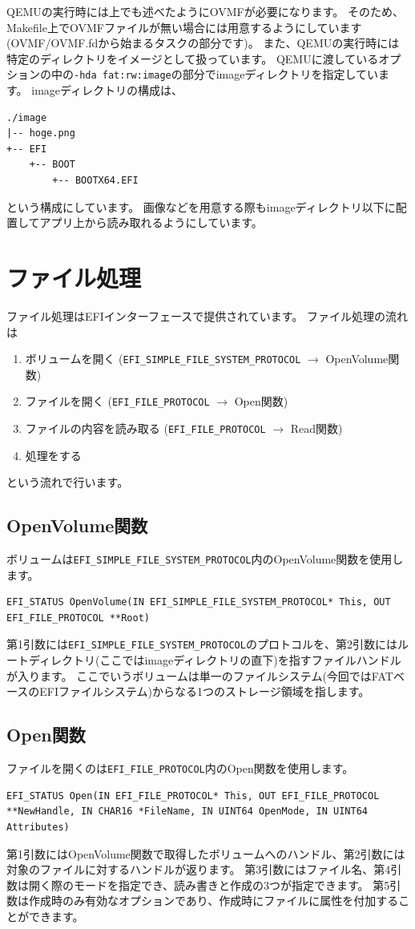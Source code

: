 \documentclass[10pt,b5paper,twoside,openany]{ltjsbook}
\begin{document}
QEMUの実行時には上でも述べたようにOVMFが必要になります。
そのため、Makefile上でOVMFファイルが無い場合には用意するようにしています(OVMF/OVMF.fdから始まるタスクの部分です)。
また、QEMUの実行時には特定のディレクトリをイメージとして扱っています。
QEMUに渡しているオプションの中の\verb+-hda fat:rw:image+の部分でimageディレクトリを指定しています。
imageディレクトリの構成は、
\begin{verbatim}
./image
|-- hoge.png
+-- EFI
    +-- BOOT
        +-- BOOTX64.EFI
\end{verbatim}
という構成にしています。
画像などを用意する際もimageディレクトリ以下に配置してアプリ上から読み取れるようにしています。

\section{ファイル処理}
ファイル処理はEFIインターフェースで提供されています。
ファイル処理の流れは
\begin{enumerate}
    \item ボリュームを開く (\verb+EFI_SIMPLE_FILE_SYSTEM_PROTOCOL+ $\rightarrow$ OpenVolume関数)
    \item ファイルを開く (\verb+EFI_FILE_PROTOCOL+ $\rightarrow$ Open関数)
    \item ファイルの内容を読み取る (\verb+EFI_FILE_PROTOCOL+ $\rightarrow$ Read関数)
    \item 処理をする
\end{enumerate}
という流れで行います。

\subsection{OpenVolume関数}
ボリュームは\verb+EFI_SIMPLE_FILE_SYSTEM_PROTOCOL+内のOpenVolume関数を使用します。
\begin{lstlisting}[style=customC]
EFI_STATUS OpenVolume(IN EFI_SIMPLE_FILE_SYSTEM_PROTOCOL* This, OUT EFI_FILE_PROTOCOL **Root)
\end{lstlisting}
第1引数には\verb+EFI_SIMPLE_FILE_SYSTEM_PROTOCOL+のプロトコルを、第2引数にはルートディレクトリ(ここではimageディレクトリの直下)を指すファイルハンドルが入ります。
ここでいうボリュームは単一のファイルシステム(今回ではFATベースのEFIファイルシステム)からなる1つのストレージ領域を指します。

\subsection{Open関数}
ファイルを開くのは\verb+EFI_FILE_PROTOCOL+内のOpen関数を使用します。
\begin{lstlisting}[style=customC]
EFI_STATUS Open(IN EFI_FILE_PROTOCOL* This, OUT EFI_FILE_PROTOCOL **NewHandle, IN CHAR16 *FileName, IN UINT64 OpenMode, IN UINT64 Attributes)
\end{lstlisting}
第1引数にはOpenVolume関数で取得したボリュームへのハンドル、第2引数には対象のファイルに対するハンドルが返ります。
第3引数にはファイル名、第4引数は開く際のモードを指定でき、読み書きと作成の3つが指定できます。
第5引数は作成時のみ有効なオプションであり、作成時にファイルに属性を付加することができます。
\end{document}
